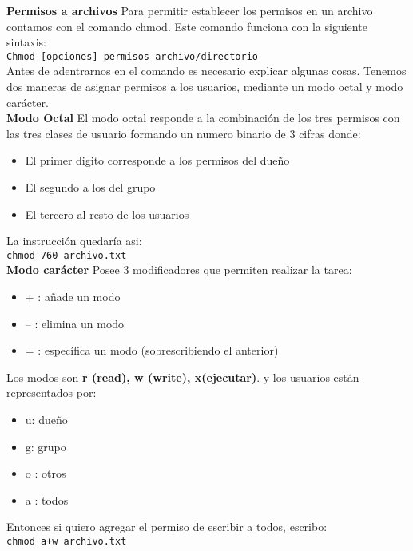 \documentclass[a4paper,11pt,spanish]{article} %
\begin{document}
\textbf{Permisos a archivos}
Para permitir establecer los permisos en un archivo contamos con el comando chmod.
Este comando funciona con la siguiente sintaxis:\\

\texttt{Chmod [opciones] permisos archivo/directorio}\\

Antes de adentrarnos en el comando es necesario explicar algunas cosas. Tenemos dos
maneras de asignar permisos a los usuarios, mediante un modo octal y modo carácter.\\

\textbf{Modo Octal}
El modo octal responde a la combinación de los tres permisos con las tres clases de
usuario formando un numero binario de 3 cifras donde:

\begin{itemize}
 \item El primer digito corresponde a los permisos del dueño
 \item El segundo a los del grupo
 \item El tercero al resto de los usuarios
\end{itemize}

La instrucción quedaría asi:\\
\texttt{chmod 760 archivo.txt}\\

\textbf{Modo carácter}
Posee 3 modificadores que permiten realizar la tarea:
\begin{itemize}
 \item + : añade un modo
 \item – : elimina un modo
 \item = : específica un modo (sobrescribiendo el anterior)
\end{itemize}

Los modos son \textbf{r (read), w (write), x(ejecutar)}. y los usuarios están representados por:
\begin{itemize}
 \item u: dueño
 \item g: grupo
 \item o : otros
 \item a : todos
\end{itemize}

Entonces si quiero agregar el permiso de escribir a todos, escribo:\\
\texttt{chmod a+w archivo.txt}\\

\cite{mirizioe}
\end{document}
